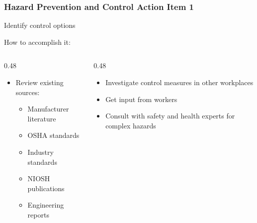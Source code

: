 \begin{frame}
	\frametitle{Hazard Prevention and Control Action Item 1}

    Identify control options

    \begin{block}{How to accomplish it:}
        \vspace{-1.5em}
        \begin{columns}[t]
            \begin{column}{0.48\linewidth}
                \begin{itemize}[<+- | alert@+>]
                    \item Review existing sources:
                    \begin{itemize}
                        \item Manufacturer literature
                        \item OSHA standards
                        \item Industry standards
                        \item NIOSH publications
                        \item Engineering reports
                    \end{itemize}
                \end{itemize}
            \end{column}
            \begin{column}{0.48\linewidth}
                \begin{itemize}[<+- | alert@+>]
                    \item Investigate control measures in other workplaces
                    \item Get input from workers
                    \item Consult with safety and health experts for complex hazards
                \end{itemize}
            \end{column}
        \end{columns}
    \end{block}
\end{frame}

